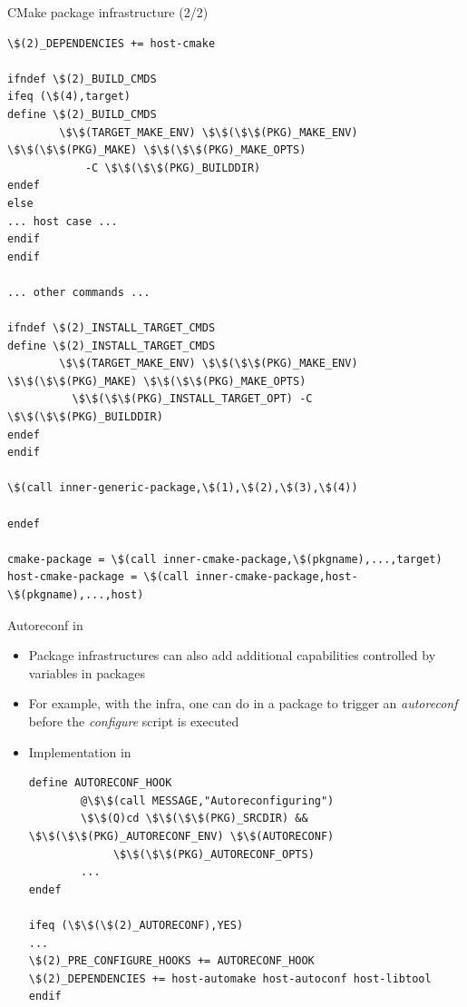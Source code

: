 \begin{frame}[fragile]{CMake package infrastructure (2/2)}

\begin{block}{}
\begin{verbatim}
\$(2)_DEPENDENCIES += host-cmake

ifndef \$(2)_BUILD_CMDS
ifeq (\$(4),target)
define \$(2)_BUILD_CMDS
        \$\$(TARGET_MAKE_ENV) \$\$(\$\$(PKG)_MAKE_ENV) \$\$(\$\$(PKG)_MAKE) \$\$(\$\$(PKG)_MAKE_OPTS)
            -C \$\$(\$\$(PKG)_BUILDDIR)
endef
else
... host case ...
endif
endif

... other commands ...

ifndef \$(2)_INSTALL_TARGET_CMDS
define \$(2)_INSTALL_TARGET_CMDS
        \$\$(TARGET_MAKE_ENV) \$\$(\$\$(PKG)_MAKE_ENV) \$\$(\$\$(PKG)_MAKE) \$\$(\$\$(PKG)_MAKE_OPTS)
          \$\$(\$\$(PKG)_INSTALL_TARGET_OPT) -C \$\$(\$\$(PKG)_BUILDDIR)
endef
endif

\$(call inner-generic-package,\$(1),\$(2),\$(3),\$(4))

endef

cmake-package = \$(call inner-cmake-package,\$(pkgname),...,target)
host-cmake-package = \$(call inner-cmake-package,host-\$(pkgname),...,host)
\end{verbatim}
\end{block}

\end{frame}

\begin{frame}[fragile]{Autoreconf in }
  \begin{itemize}
  \item Package infrastructures can also add additional capabilities
    controlled by variables in packages
  \item For example, with the  infra, one can
    do  in a package to trigger an {\em
      autoreconf} before the {\em configure} script is executed
  \item Implementation in 
    \begin{block}{}
      \begin{verbatim}
define AUTORECONF_HOOK
        @\$\$(call MESSAGE,"Autoreconfiguring")
        \$\$(Q)cd \$\$(\$\$(PKG)_SRCDIR) && \$\$(\$\$(PKG)_AUTORECONF_ENV) \$\$(AUTORECONF)
             \$\$(\$\$(PKG)_AUTORECONF_OPTS)
        ...
endef

ifeq (\$\$(\$(2)_AUTORECONF),YES)
...
\$(2)_PRE_CONFIGURE_HOOKS += AUTORECONF_HOOK
\$(2)_DEPENDENCIES += host-automake host-autoconf host-libtool
endif
      \end{verbatim}
    \end{block}
  \end{itemize}
\end{frame}

